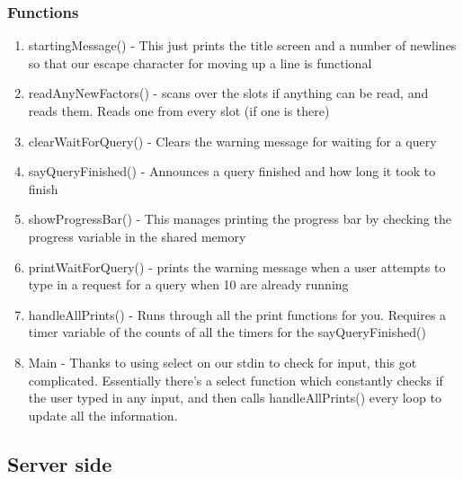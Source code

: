 \documentclass{article}
\begin{document}
    \subsubsection*{Functions}
    \begin{enumerate}
        \item startingMessage() - This just prints the title screen and a number of newlines so
        that our escape character for moving up a line is functional
        \item readAnyNewFactors() - scans over the slots if anything can be read,
        and reads them. Reads one from every slot (if one is there)
        \item clearWaitForQuery() - Clears the warning message for waiting for a query
        \item sayQueryFinished() - Announces a query finished and how
        long it took to finish
        \item showProgressBar() - This manages printing the progress bar by
        checking the progress variable in the shared memory
        \item printWaitForQuery() - prints the warning message when a user
        attempts to type in a request for a query when 10 are already running
        \item handleAllPrints() - Runs through all the print functions for you.
        Requires a timer variable of the counts of all the timers for the sayQueryFinished()
        \item Main - Thanks to using select on our stdin to check for input, this
        got complicated.
        Essentially there's a select function which constantly checks if the user
        typed in any input, and then calls handleAllPrints() every loop to update
        all the information.
    \end{enumerate}
    \subsection*{Server side}
\end{document}
